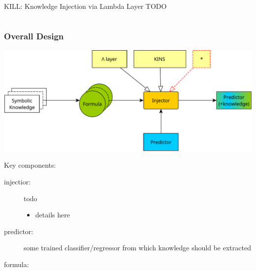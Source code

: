 \documentclass[presentation]{beamer}\mode<presentation>{\usetheme{AMSBolognaFC}}
\begin{document}
\begin{frame}[allowframebreaks]{KILL: Knowledge Injection via Lambda Layer}
    TODO
\end{frame}

\section{\psyki}

\begin{frame}[allowframebreaks]
\frametitle{Overall Design}

    \begin{center}
        \includegraphics[width=\linewidth]{figures/psyki-design.pdf}
    \end{center}

    \framebreak

    Key components:
    \begin{description}
        \item[injectior:] todo
        \begin{itemize}
            \item details here
        \end{itemize}

        \item[predictor:] some trained classifier/regressor from which knowledge should be extracted
                
        \item[formula:] 
    \end{description}


\end{frame}
\end{document}
